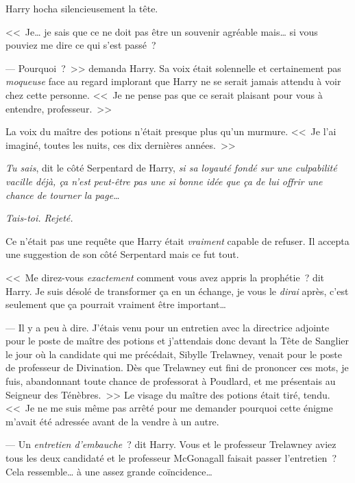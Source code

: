 Harry hocha silencieusement la tête.

<<~Je… je sais que ce ne doit pas être un souvenir agréable mais… si vous pouviez me dire ce qui s'est passé~?

--- Pourquoi~?~>> demanda Harry. Sa voix était solennelle et certainement pas \emph{moqueuse} face au regard implorant que Harry ne se serait jamais attendu à voir chez cette personne. <<~Je ne pense pas que ce serait plaisant pour vous à entendre, professeur.~>>

La voix du maître des potions n'était presque plus qu'un murmure. <<~Je l'ai imaginé, toutes les nuits, ces dix dernières années.~>>

\emph{Tu sais}, dit le côté Serpentard de Harry, \emph{si sa loyauté fondé sur une culpabilité vacille déjà, ça n'est peut-être pas une si bonne idée que ça de lui offrir une chance de tourner la page…}

\emph{Tais-toi. Rejeté.}

Ce n'était pas une requête que Harry était \emph{vraiment} capable de refuser. Il accepta une suggestion de son côté Serpentard mais ce fut tout.

<<~Me direz-vous \emph{exactement} comment vous avez appris la prophétie~? dit Harry. Je suis désolé de transformer ça en un échange, je vous le \emph{dirai} après, c'est seulement que ça pourrait vraiment être important…

--- Il y a peu à dire. J'étais venu pour un entretien avec la directrice adjointe pour le poste de maître des potions et j'attendais donc devant la Tête de Sanglier le jour où la candidate qui me précédait, Sibylle Trelawney, venait pour le poste de professeur de Divination. Dès que Trelawney eut fini de prononcer ces mots, je fuis, abandonnant toute chance de professorat à Poudlard, et me présentais au Seigneur des Ténèbres.~>> Le visage du maître des potions était tiré, tendu. <<~Je ne me suis même pas arrêté pour me demander pourquoi cette énigme m'avait été adressée avant de la vendre à un autre.

--- Un \emph{entretien d'embauche}~? dit Harry. Vous et le professeur Trelawney aviez tous les deux candidaté et le professeur McGonagall faisait passer l'entretien~? Cela ressemble… à une assez grande coïncidence…

